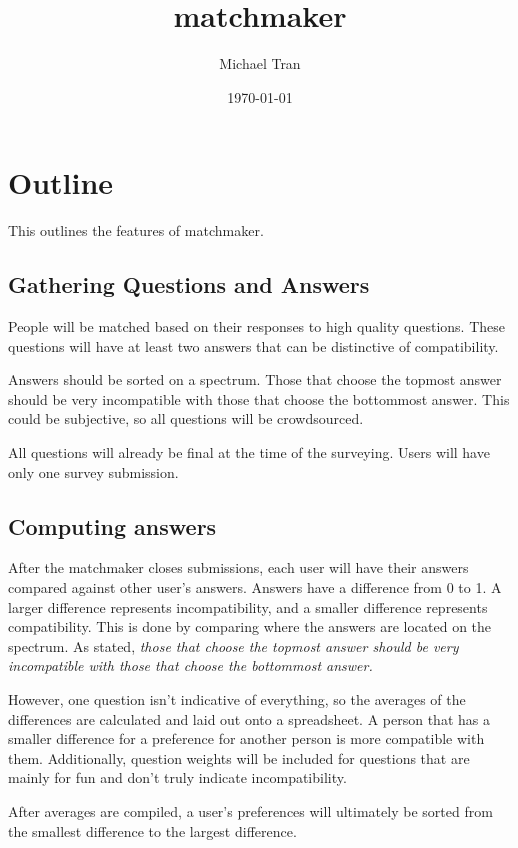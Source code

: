 \documentclass[12pt]{article}
\title{matchmaker}
\author{Michael Tran}
\date{\today}
\begin{document}
\maketitle

\section{Outline}
This outlines the features of matchmaker.

\subsection{Gathering Questions and Answers}
People will be matched based on their responses to high quality questions. These
questions will have at least two answers that can be distinctive of
compatibility.

Answers should be sorted on a spectrum. Those that choose the topmost answer
should be very incompatible with those that choose the bottommost answer. This
could be subjective, so all questions will be crowdsourced.

All questions will already be final at the time of the surveying. Users will
have only one survey submission.

\subsection{Computing answers}
After the matchmaker closes submissions, each user will have their answers
compared against other user's answers. Answers have a difference from 0 to
1. A larger difference represents incompatibility, and a smaller difference
represents compatibility. This is done by comparing where the answers are
located on the spectrum. As stated, \textit{those that choose the topmost answer
should be very incompatible with those that choose the bottommost answer.}

However, one question isn't indicative of everything, so the averages of the
differences are calculated and laid out onto a spreadsheet. A person that has a
smaller difference for a preference for another person is more compatible with
them. Additionally, question weights will be included for questions that are
mainly for fun and don't truly indicate incompatibility.

After averages are compiled, a user's preferences will ultimately be sorted from
the smallest difference to the largest difference.
\end{document}
